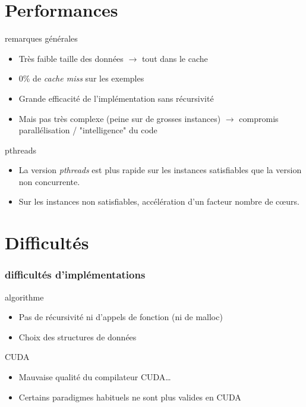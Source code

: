 \documentclass{beamer}
\newcommand{\cuda}{\textsc{CUDA}}
\begin{document}

\section{Performances}

\begin{frame}


\begin{block}{remarques générales}
\begin{itemize}
    \item Très faible taille des données $\rightarrow$ tout dans le cache
    \item 0\% de \emph{cache miss} sur les exemples
    \item Grande efficacité de l'implémentation sans récursivité
    \item Mais pas très complexe (peine sur de grosses instances) $\rightarrow$ compromis parallélisation / "intelligence" du code
\end{itemize}
\end{block}
\pause
\begin{block}{pthreads}
\begin{itemize}
    \item La version \emph{pthreads} est plus rapide sur les instances satisfiables que la version non concurrente.
    \item Sur les instances non satisfiables, accélération d'un facteur nombre de cœurs.
\end{itemize}
\end{block}

\end{frame}
   

\section{Difficultés}
    
\begin{frame}
\frametitle{difficultés d'implémentations}
\begin{block}{algorithme}
\begin{itemize}
    \item Pas de récursivité ni d'appels de fonction (ni de malloc)
    \item Choix des structures de données
\end{itemize}
\end{block}

\pause

\begin{block}{\cuda}
\begin{itemize}
    \item Mauvaise qualité du compilateur \cuda{}\ldots{}
    \item Certains paradigmes habituels ne sont plus valides en \cuda
\end{itemize}
\end{block}

\end{frame}
\end{document}
